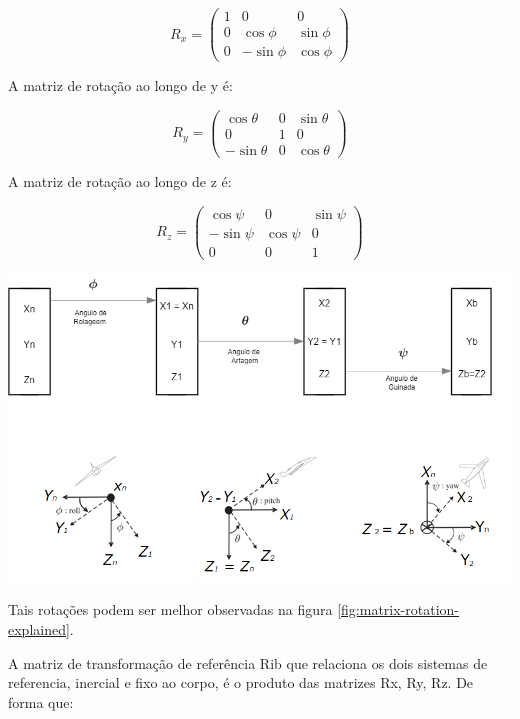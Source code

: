 \documentclass[
	12pt,				%
	openright,			%
	twoside,			%
	a4paper,			%
	english,			%
	brazil				%
	]{abntex2}
\begin{document}
\begin{equation*}
	R_x = \begin{pmatrix}
		1 & 0         & 0        \\
		0 & \cos\phi  & \sin\phi \\
		0 & -\sin\phi & \cos\phi
	\end{pmatrix}
\end{equation*}

A  matriz de rotação ao longo de y é:

\begin{equation*}
	R_y = \begin{pmatrix}
		\cos\theta  & 0 & \sin\theta \\
		0           & 1 & 0          \\
		-\sin\theta & 0 & \cos\theta
	\end{pmatrix}
\end{equation*}

A  matriz de rotação ao longo de z é:

\begin{equation*}
	R_z = \begin{pmatrix}
		\cos\psi  & 0        & \sin\psi \\
		-\sin\psi & \cos\psi & 0        \\
		0         & 0        & 1
	\end{pmatrix}
\end{equation*}

	\includegraphics[width=1\textwidth]{matrix-rotation-explained}


Tais rotações podem ser melhor observadas na figura \ref{fig:matrix-rotation-explained}.

A matriz de transformação de referência  Rib que relaciona os dois sistemas de referencia, inercial e fixo ao corpo, é o produto das matrizes Rx, Ry, Rz. De forma que:
\end{document}

